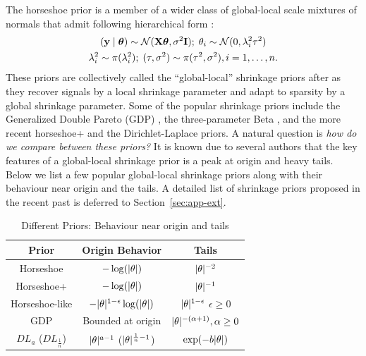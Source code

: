 \documentclass[11pt]{article}
\begin{document}
%
The horseshoe prior is a member of a wider class of global-local scale mixtures of normals that admit following hierarchical form \citep{polson2010shrink}: 
\begin{gather*}
({\bf y} \mid \boldsymbol{\theta}) \sim {\cal N}({\bf X} \boldsymbol{\theta}, \sigma^2 {\bf I}) ;\; \theta_i \sim {\cal N}(0, \lambda_i^2 \tau^2) \\
\lambda_i^2 \sim \pi(\lambda_i^2) ; \; (\tau,\sigma^2) \sim  \pi(\tau^2,\sigma^2), i = 1, \ldots, n. 
\end{gather*}
These priors are collectively called the ``global-local'' shrinkage priors after \cite{polson2010shrink} as they recover signals by a local shrinkage parameter and adapt to sparsity by a global shrinkage parameter. Some of the popular shrinkage priors include the Generalized Double Pareto (GDP) \citep{armagan2013generalized}, the three-parameter Beta \citep{armagan2011generalized}, and the more recent horseshoe+ \citep{bhadra2015horseshoe+} and the Dirichlet-Laplace \citep{bhattacharya2014dirichlet} priors. A natural question is \textit{how do we compare between these priors?} It is known due to several authors \citep[e.g.]{polson2010shrink,bhadra2015default,van2015conditions} that the key features of a global-local shrinkage prior is a peak at origin and heavy tails. Below we list a few popular global-local shrinkage priors along with their behaviour near origin and the tails. A detailed list of shrinkage priors proposed in the recent past is deferred to Section~\ref{sec:app-ext}.

\begin{table}%
\centering
\begin{tabular}{| c | c |c |}
\hline
Prior & Origin Behavior & Tails \\
\hline 
Horseshoe & $-\log(\lvert\theta\rvert)$ & $\lvert\theta\rvert^{-2}$ \\
Horseshoe+ & $-\log(\lvert\theta\rvert)$ & $\lvert\theta\rvert^{-1}$ \\
Horseshoe-like & $-\lvert\theta\rvert^{1-\epsilon}\log(\lvert\theta\rvert)$ & $\lvert\theta\rvert^{1-\epsilon}$ $\epsilon \ge 0$\\
GDP & Bounded at origin & $\lvert\theta\rvert^{-(\alpha + 1)}, \alpha \ge 0$ \\
$DL_{a}$ ($DL_{\frac{1}{n}}$) & $\lvert\theta\rvert^{a-1}$ ($\lvert\theta\rvert^{\frac{1}{n}-1}$) & $\exp(-b\lvert\theta\rvert)$ \\
\hline
\end{tabular}
\caption{Different Priors: Behaviour near origin and tails}
\label{tab:priors}
\end{table}
\end{document}
